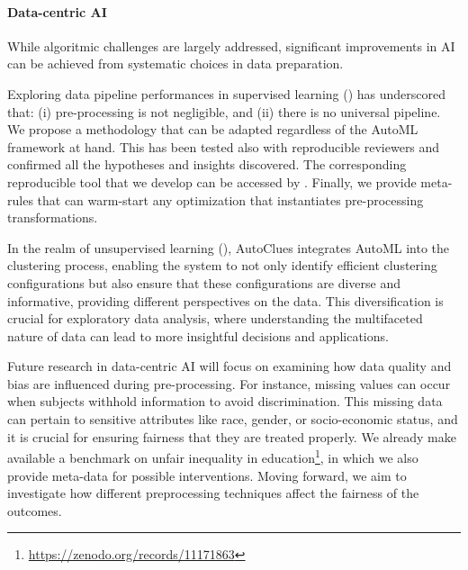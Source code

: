 \paragraph{Data-centric AI}
While algoritmic challenges are largely addressed, significant improvements in AI can be achieved from systematic choices in data preparation.

Exploring data pipeline performances in supervised learning () has underscored that: (i) pre-processing is not negligible, and (ii) there is no universal pipeline.
We propose a methodology that can be adapted regardless of the AutoML framework at hand.
This has been tested also with reproducible reviewers and confirmed all the hypotheses and insights discovered.
The corresponding reproducible tool that we develop can be accessed by \cite{giovanelli2023reproducible}.
Finally, we provide meta-rules that can warm-start any optimization that instantiates pre-processing transformations.

In the realm of unsupervised learning (), AutoClues integrates AutoML into the clustering process, enabling the system to not only identify efficient clustering configurations but also ensure that these configurations are diverse and informative, providing different perspectives on the data.
This diversification is crucial for exploratory data analysis, where understanding the multifaceted nature of data can lead to more insightful decisions and applications.

Future research in data-centric AI will focus on examining how data quality and bias are influenced during pre-processing.
For instance, missing values can occur when subjects withhold information to avoid discrimination.
This missing data can pertain to sensitive attributes like race, gender, or socio-economic status, and it is crucial for ensuring fairness that they are treated properly.
We already make available a benchmark on unfair inequality in education\footnote{\url{https://zenodo.org/records/11171863}}, in which we also provide meta-data for possible interventions.
Moving forward, we aim to investigate how different preprocessing techniques affect the fairness of the outcomes.

